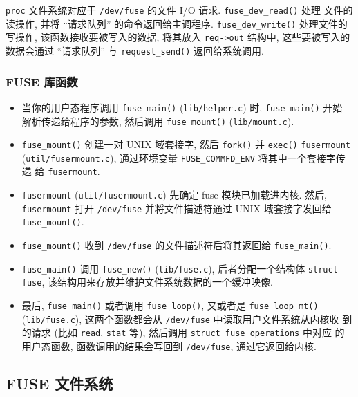 \documentclass[nofonts, titlepage]{ctexart}
\begin{document}
\texttt{proc} 文件系统对应于 \texttt{/dev/fuse} 的文件 I/O 请求.
\texttt{fuse\_dev\_read()} 处理 文件的读操作, 并将 ``请求队列''
的命令返回给主调程序. \texttt{fuse\_dev\_write()} 处理文件的写操作,
该函数接收要被写入的数据, 将其放入 \texttt{req-\textgreater{}out}
结构中, 这些要被写入的数据会通过 ``请求队列'' 与
\texttt{request\_send()} 返回给系统调用.

\subsubsection{FUSE 库函数}\label{fuse-ux5e93ux51fdux6570}

\begin{itemize}
\item
  当你的用户态程序调用 \texttt{fuse\_main()} (\texttt{lib/helper.c}) 时,
  \texttt{fuse\_main()} 开始 解析传递给程序的参数, 然后调用
  \texttt{fuse\_mount()} (\texttt{lib/mount.c}).
\item
  \texttt{fuse\_mount()} 创建一对 UNIX 域套接字, 然后 \texttt{fork()} 并
  \texttt{exec()} \texttt{fusermount} \\ (\texttt{util/fusermount.c}),
  通过环境变量 \texttt{FUSE\_COMMFD\_ENV} 将其中一个套接字传递 给
  \texttt{fusermount}.
\item
  \texttt{fusermount} (\texttt{util/fusermount.c}) 先确定 fuse
  模块已加载进内核. 然后, \texttt{fusermount} 打开 \texttt{/dev/fuse}
  并将文件描述符通过 UNIX 域套接字发回给 \texttt{fuse\_mount()}.
\item
  \texttt{fuse\_mount()} 收到 \texttt{/dev/fuse}
  的文件描述符后将其返回给 \texttt{fuse\_main()}.
\item
  \texttt{fuse\_main()} 调用 \texttt{fuse\_new()} (\texttt{lib/fuse.c}),
  后者分配一个结构体 \texttt{struct fuse},
  该结构用来存放并维护文件系统数据的一个缓冲映像.
\item
  最后, \texttt{fuse\_main()} 或者调用 \texttt{fuse\_loop()}, 又或者是
  \texttt{fuse\_loop\_mt()} (\texttt{lib/fuse.c}), 这两个函数都会从
  \texttt{/dev/fuse} 中读取用户文件系统从内核收 到的请求 (比如
  \texttt{read}, \texttt{stat} 等), 然后调用
  \texttt{struct fuse\_operations} 中对应 的用户态函数,
  函数调用的结果会写回到 \texttt{/dev/fuse}, 通过它返回给内核.
\end{itemize}

\subsection{FUSE 文件系统}
\label{fuse-ux6587ux4ef6ux7cfbux7edfux7b80ux4ecb}
\end{document}
